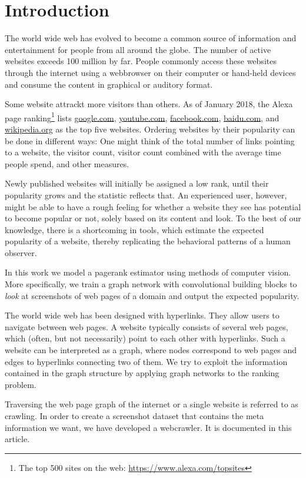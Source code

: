 \section{Introduction}
\label{section:introduction}

The world wide web has evolved to become a common source of information and entertainment for people from all around the globe. The number of active websites exceeds 100 million by far. People commonly access these websites through the internet using a webbrowser on their computer or hand-held devices and consume the content in graphical or auditory format.

Some website attrackt more visitors than others. As of January 2018, the Alexa page ranking\footnote{The top 500 sites on the web: \url{https://www.alexa.com/topsites}} lists \url{google.com}, \url{youtube.com}, \url{facebook.com}, \url{baidu.com}, and \url{wikipedia.org} as the top five websites. Ordering websites by their popularity can be done in different ways: One might think of the total number of links pointing to a website, the visitor count, visitor count combined with the average time people spend, and other measures.

Newly published websites will initially be assigned a low rank, until their popularity grows and the statistic reflects that. An experienced user, however, might be able to have a rough feeling for whether a website they see has potential to become popular or not, solely based on its content and look. To the best of our knowledge, there is a shortcoming in tools, which estimate the expected popularity of a website, thereby replicating the behavioral patterns of a human observer.

In this work we model a pagerank estimator using methods of computer vision. More specifically, we train a graph network with convolutional building blocks to \textit{look} at screenshots of web pages of a domain and output the expected popularity.

The world wide web has been designed with hyperlinks. They allow users to navigate between web pages. A website typically consists of several web pages, which (often, but not necessarily) point to each other with hyperlinks. Such a website can be interpreted as a graph, where nodes correspond to web pages and edges to hyperlinks connecting two of them. We try to exploit the information contained in the graph structure by applying graph networks to the ranking problem.

Traversing the web page graph of the internet or a single website is referred to as crawling. In order to create a screenshot dataset that contains the meta information we want, we have developed a webcrawler. It is documented in this article.

